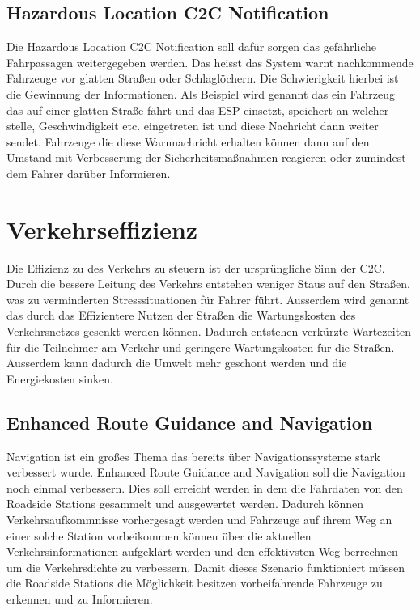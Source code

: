 \subsection{Hazardous Location C2C Notification}
Die Hazardous Location C2C Notification soll dafür sorgen das gefährliche Fahrpassagen weitergegeben werden. Das heisst das System warnt nachkommende Fahrzeuge vor glatten Straßen oder Schlaglöchern. Die Schwierigkeit hierbei ist die Gewinnung der Informationen. Als Beispiel wird genannt das ein Fahrzeug das auf einer glatten Straße fährt und das ESP einsetzt, speichert an welcher stelle, Geschwindigkeit etc. eingetreten ist und diese Nachricht dann weiter sendet. Fahrzeuge die diese Warnnachricht erhalten können dann auf den Umstand mit Verbesserung der Sicherheitsmaßnahmen reagieren oder zumindest dem Fahrer darüber Informieren. 

\section{Verkehrseffizienz}
Die Effizienz zu des Verkehrs zu steuern ist der ursprüngliche Sinn der \acl{C2C}. Durch die bessere Leitung des Verkehrs entstehen weniger Staus auf den Straßen, was zu verminderten Stresssituationen für Fahrer führt. Ausserdem wird genannt das durch das Effizientere Nutzen der Straßen die Wartungskosten des Verkehrsnetzes gesenkt werden können. Dadurch entstehen verkürzte Wartezeiten für die Teilnehmer am Verkehr und geringere Wartungskosten für die Straßen. Ausserdem kann dadurch die Umwelt mehr geschont werden und die Energiekosten sinken. 

\subsection{Enhanced Route Guidance and Navigation}
Navigation ist ein großes Thema das bereits über Navigationssysteme stark verbessert wurde. Enhanced Route Guidance and Navigation soll die Navigation noch einmal verbessern. Dies soll erreicht werden in dem die Fahrdaten von den Roadside Stations gesammelt und ausgewertet werden. Dadurch können Verkehrsaufkommnisse vorhergesagt werden und Fahrzeuge auf ihrem Weg an einer solche Station vorbeikommen können über die aktuellen Verkehrsinformationen aufgeklärt werden und den effektivsten Weg berrechnen um die Verkehrsdichte zu verbessern. Damit dieses Szenario funktioniert müssen die Roadside Stations die Möglichkeit besitzen vorbeifahrende Fahrzeuge zu erkennen und zu Informieren. 

